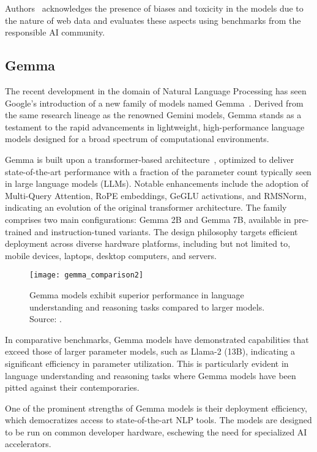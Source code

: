 Authors~\cite{touvron2023llama} acknowledges the presence of biases and toxicity in the models due to the nature of web data and evaluates these aspects using benchmarks from the responsible AI community.

\subsection{Gemma}
\label{subsec:gemma}

The recent development in the domain of Natural Language Processing has seen Google's introduction of a new family of models named Gemma~\cite{gemma_google_ai, gemmateam2024gemma}.
Derived from the same research lineage as the renowned Gemini models, Gemma stands as a testament to the rapid advancements in lightweight, high-performance language models designed for a broad spectrum of computational environments.

Gemma is built upon a transformer-based architecture~\cite{vaswani2023attention}, optimized to deliver state-of-the-art performance with a fraction of the parameter count typically seen in large language models (LLMs).
Notable enhancements include the adoption of Multi-Query Attention, RoPE embeddings, GeGLU activations, and RMSNorm, indicating an evolution of the original transformer architecture.
The family comprises two main configurations: Gemma 2B and Gemma 7B, available in pre-trained and instruction-tuned variants.
The design philosophy targets efficient deployment across diverse hardware platforms, including but not limited to, mobile devices, laptops, desktop computers, and servers.

\begin{figure}[ht!]
    \centering
    \texttt{[image: gemma\_comparison2]}
    \caption{Gemma models exhibit superior performance in language understanding and reasoning tasks compared to larger models. Source: \protect\cite{gemmateam2024gemma}.}
    \label{fig:gemma-comparison2}
\end{figure}

In comparative benchmarks, Gemma models have demonstrated capabilities that exceed those of larger parameter models, such as Llama-2 (13B), indicating a significant efficiency in parameter utilization.
This is particularly evident in language understanding and reasoning tasks where Gemma models have been pitted against their contemporaries.

One of the prominent strengths of Gemma models is their deployment efficiency, which democratizes access to state-of-the-art NLP tools.
The models are designed to be run on common developer hardware, eschewing the need for specialized AI accelerators.

